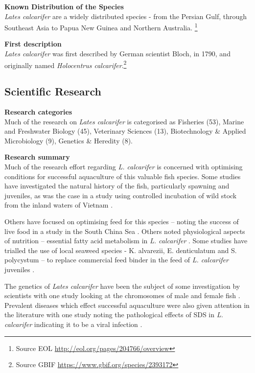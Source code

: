 \documentclass[openany]{book}
\let\rmarkdownfootnote\footnote%
\def\footnote{\protect\rmarkdownfootnote}
\theoremstyle{definition}
\theoremstyle{definition}
\theoremstyle{definition}
\theoremstyle{remark}
\begin{document}
\textbf{Known Distribution of the Species}\\
\emph{Lates calcarifer} are a widely distributed species - from the
Persian Gulf, through Southeast Asia to Papua New Guinea and Northern
Australia. \footnote{Source EOL
  \url{http://eol.org/pages/204766/overview}}

\textbf{First description}\\
\emph{Lates calcarifer} was first described by German scientist Bloch,
in 1790, and originally named \emph{Holocentrus calcarifer}.\footnote{Source
  GBIF \url{https://www.gbif.org/species/2393172}}

\hypertarget{scientific-research-1}{%
\subsection{Scientific Research}\label{scientific-research-1}}

\textbf{Research categories}\\
Much of the research on \emph{Lates calcarifer} is categorised as
Fisheries (53), Marine and Freshwater Biology (45), Veterinary Sciences
(13), Biotechnology \& Applied Microbiology (9), Genetics \& Heredity
(8).

\textbf{Research summary}\\
Much of the research effort regarding \emph{L. calcarifer} is concerned
with optimising conditions for successful aquaculture of this valuable
fish species. Some studies have investigated the natural history of the
fish, particularly spawning and juveniles, as was the case in a study
using controlled incubation of wild stock from the inland waters of
Vietnam \citep{Shadrin_2015}.

Others have focused on optimising feed for this species -- noting the
success of live food in a study in the South China Sea
\citep{Shansudin_1997}. Others noted physiological aspects of nutrition
-- essential fatty acid metabolism in \emph{L. calcarifer}
\citep{Mohd_Yusof_2010}. Some studies have trialled the use of local
seaweed species - K. alvarezii, E. denticulatum and S. polycystum -- to
replace commercial feed binder in the feed of \emph{L. calcarifer}
juveniles \citep{Shapawi_2015}.

The genetics of \emph{Lates calcarifer} have been the subject of some
investigation by scientists with one study looking at the chromosomes of
male and female fish \citep{Phimphan_2015}. Prevalent diseases which
effect successful aquaculture were also given attention in the
literature with one study noting the pathological effects of SDS in
\emph{L. calcarifer} indicating it to be a viral infection
\citep{Gibson_Kueh_2011}.
\end{document}
